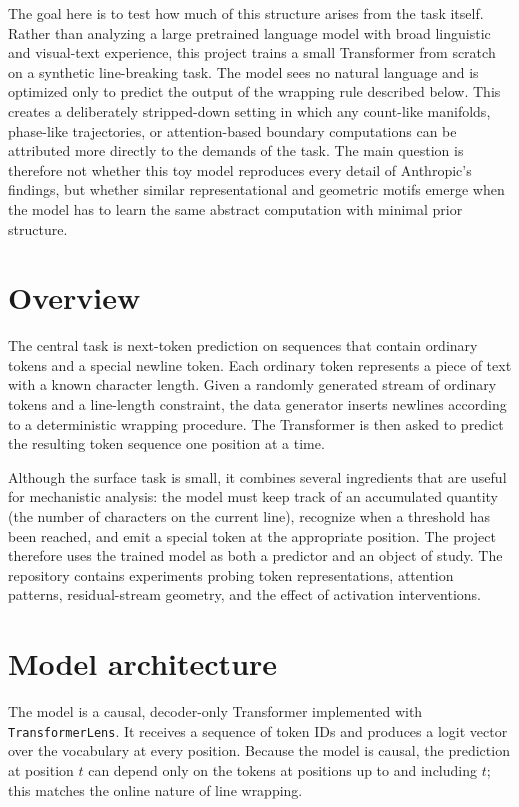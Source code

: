 \documentclass[11pt]{article}
\begin{document}
The goal here is to test how much of this structure arises from the task
itself.  Rather than analyzing a large pretrained language model with broad
linguistic and visual-text experience, this project trains a small Transformer
from scratch on a synthetic line-breaking task.  The model sees no natural
language and is optimized only to predict the output of the wrapping rule
described below.  This creates a deliberately stripped-down setting in which
any count-like manifolds, phase-like trajectories, or attention-based boundary
computations can be attributed more directly to the demands of the task.  The
main question is therefore not whether this toy model reproduces every detail
of Anthropic's findings, but whether similar representational and geometric
motifs emerge when the model has to learn the same abstract computation with
minimal prior structure.

\section{Overview}

The central task is next-token prediction on sequences that contain ordinary
tokens and a special newline token.  Each ordinary token represents a piece
of text with a known character length.  Given a randomly generated stream of
ordinary tokens and a line-length constraint, the data generator inserts
newlines according to a deterministic wrapping procedure.  The Transformer is
then asked to predict the resulting token sequence one position at a time.

Although the surface task is small, it combines several ingredients that are
useful for mechanistic analysis: the model must keep track of an accumulated
quantity (the number of characters on the current line), recognize when a
threshold has been reached, and emit a special token at the appropriate
position.  The project therefore uses the trained model as both a predictor
and an object of study.  The repository contains experiments probing token
representations, attention patterns, residual-stream geometry, and the effect
of activation interventions.

\section{Model architecture}

The model is a causal, decoder-only Transformer implemented with
\texttt{TransformerLens}.  It receives a sequence of token IDs and produces a
logit vector over the vocabulary at every position.  Because the model is
causal, the prediction at position $t$ can depend only on the tokens at
positions up to and including $t$; this matches the online nature of line
wrapping.
\end{document}
